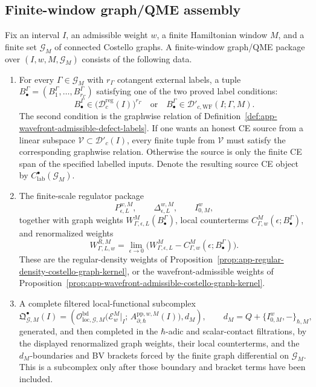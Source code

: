 \subsection*{Finite-window graph/QME assembly}

\begin{defn}\label{defn:finite-window-graph-qme-package}
  Fix an interval \(I\), an admissible weight \(w\), a finite Hamiltonian
  window \(M\), and a finite set \(\mathcal G_M\) of connected Costello
  graphs.  A finite-window graph/QME package over \((I,w,M,\mathcal G_M)\)
  consists of the following data.
  \begin{enumerate}[label=(F\arabic*)]
    \item For every \(\Gamma\in\mathcal G_M\) with \(r_\Gamma\) cotangent
    external labels, a tuple
    \(B^\Gamma_\bullet=(B^\Gamma_1,\ldots,B^\Gamma_{r_\Gamma})\) satisfying
    one of the two proved label conditions:
    \[
      B^\Gamma_\bullet\in
      \bigl(\mathcal D^{\mathrm{reg}}_c(I)\bigr)^{r_\Gamma}
      \quad\text{or}\quad
      B^\Gamma_\bullet\in
      \mathcal D'_{c,\mathrm{WF}}(I;\Gamma,M).
    \]
    The second condition is the graphwise relation of
    Definition~\ref{def:app-wavefront-admissible-defect-labels}.  If one
    wants an honest CE source from a linear subspace
    \(\mathcal V\subset\mathcal D'_c(I)\), every finite tuple from
    \(\mathcal V\) must satisfy the corresponding graphwise relation.
    Otherwise the source is only the finite CE span of the specified
    labelled inputs.  Denote the resulting source CE object by
    \(C^\bullet_{\mathrm{lab}}(\mathcal G_M)\).

    \item The finite-scale regulator package
    \[
      P_{\epsilon,L}^{w,M},\qquad \Delta_{\epsilon,L}^{w,M},
      \qquad I_{0,M}^{w},
    \]
    together with graph weights
    \(W^M_{\Gamma,\epsilon,L}(B^\Gamma_\bullet)\), local counterterms
    \(C^M_{\Gamma,w}(\epsilon;B^\Gamma_\bullet)\), and renormalized
    weights
    \[
      W^{R,M}_{\Gamma,L,w}
        =
      \lim_{\epsilon\to0}
      \bigl(
        W^M_{\Gamma,\epsilon,L}
        -
        C^M_{\Gamma,w}(\epsilon;B^\Gamma_\bullet)
      \bigr).
    \]
    These are the regular-density weights of
    Proposition~\ref{prop:app-regular-density-costello-graph-kernel}, or
    the wavefront-admissible weights of
    Proposition~\ref{prop:app-wavefront-admissible-costello-graph-kernel}.

    \item A complete filtered local-functional subcomplex
    \[
      \mathfrak Q^\bullet_{\mathcal G,M}(I)
        =
      \left(
        \mathcal O^{\mathrm{bd}}_{\mathrm{loc},\mathcal G,M}\bigl(
          \mathcal E_w^M|_I;\,
          A_{\partial,\hbar}^{\mathrm{pp},w,M}(I)\bigr),
        d_M
      \right),
      \qquad
      d_M=Q+\{I^w_{0,M},-\}_{\hbar,M},
    \]
    generated, and then completed in the \(\hbar\)-adic and scalar-contact
    filtrations, by the displayed renormalized graph weights, their local
    counterterms, and the \(d_M\)-boundaries and BV brackets forced by the
    finite graph differential on \(\mathcal G_M\).  This is a subcomplex
    only after those boundary and bracket terms have been included.


\end{enumerate}
\end{defn}

